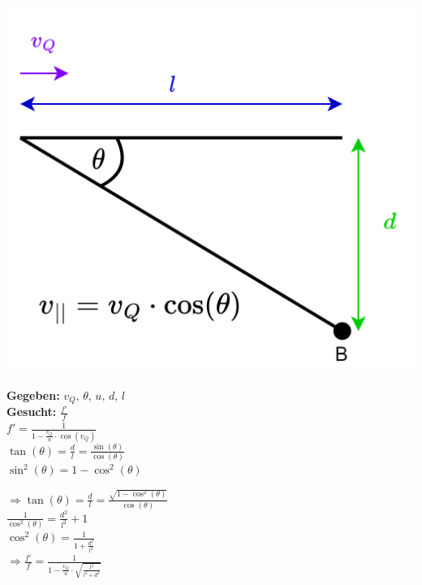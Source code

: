 \begin{minipage}{0.48\linewidth}
\includegraphics[width=0.98\linewidth]{Bilder/Wellen-Optik/beispiel_bewegte_quelle} \\
\vspace{2.5cm}
\end{minipage}
\hfill
\begin{minipage}{0.48\linewidth}
\textbf{Gegeben:} $v_Q, \, \theta, \,u, \,d, \,l$ \\
\textbf{Gesucht:} $\frac{f'}{f}$ \\

$f' =  \frac{1}{1 - \frac{v_Q}{u} \cdot \cos(v_Q)}$ \\
$\tan(\theta) = \frac{d}{l} =  \frac{\sin(\theta)}{\cos(\theta)}$ \\
$\sin^2(\theta) = 1 - \cos^2(\theta)$ \\
\vspace{0.2cm}


$\Rightarrow \tan(\theta) = \frac{d}{l} = \frac{\sqrt{ 1 - \cos^2(\theta)}}{\cos(\theta)} $ \\

$ \frac{1}{\cos^2(\theta)} = \frac{d^2}{l^2} + 1 $ \\

$\cos^2(\theta) = \frac{1}{1 + \frac{d^2}{l^2}}$ \\

$\boxed{ \Rightarrow \frac{f'}{f} = \frac{1}{1 - \frac{v_Q}{u} \cdot \sqrt{\frac{l^2}{l^2 + d^2} } } } $

\end{minipage}





